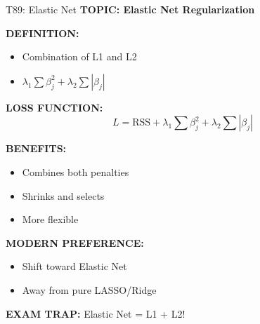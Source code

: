 \documentclass[8pt]{beamer}
\begin{document}
	\begin{frame}{T89: Elastic Net}
		\fontsize{6.5}{7.5}\selectfont
		\textbf{TOPIC: Elastic Net Regularization}
		
		\vspace{0.1cm}
		\textbf{DEFINITION:}
		\begin{itemize}
			\item Combination of L1 and L2
			\item $\lambda_1 \sum \beta_j^2 + \lambda_2 \sum |\beta_j|$
		\end{itemize}
		
		\vspace{0.1cm}
		\textbf{LOSS FUNCTION:}
		\[
		L = \text{RSS} + \lambda_1 \sum \beta_j^2 + \lambda_2 \sum |\beta_j|
		\]
		
		\vspace{0.1cm}
		\textbf{BENEFITS:}
		\begin{itemize}
			\item Combines both penalties
			\item Shrinks and selects
			\item More flexible
		\end{itemize}
		
		\vspace{0.1cm}
		\textbf{MODERN PREFERENCE:}
		\begin{itemize}
			\item Shift toward Elastic Net
			\item Away from pure LASSO/Ridge
		\end{itemize}
		
		\textcolor{myred}{\textbf{EXAM TRAP:}} Elastic Net = \textcolor{myblue}{L1 + L2}!
	\end{frame}
	
\end{document}
